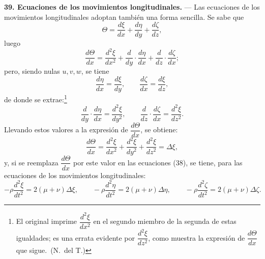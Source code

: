 \noindent\textbf{39. Ecuaciones de los movimientos longitudinales.} — Las
ecuaciones de los movimientos longitudinales adoptan también una forma
sencilla. Se sabe que
\[
\Theta=\frac{d\xi}{dx}+\frac{d\eta}{dy}+\frac{d\zeta}{dz},
\]
luego
\[
\frac{d\Theta}{dx}=\frac{d^2\xi}{dx^2}+\frac{d}{dy}\cdot\frac{d\eta}{dx}+\frac{d}{dz}\cdot\frac{d\zeta}{dx};
\]
pero, siendo nulas $u,v,w$, se tiene
\[
\frac{d\eta}{dx}=\frac{d\xi}{dy},\qquad \frac{d\zeta}{dx}=\frac{d\xi}{dz},
\]
de donde se extrae:\footnote{El original imprime
$\dfrac{d^2\xi}{dx^2}$ en el segundo miembro de la segunda de estas
igualdades; es una errata evidente por $\dfrac{d^2\xi}{dz^2}$, como muestra
la expresión de $\dfrac{d\Theta}{dx}$ que sigue.~(N.~del T.)}
\[
\frac{d}{dy}\cdot\frac{d\eta}{dx}=\frac{d^2\xi}{dy^2},\qquad
\frac{d}{dz}\cdot\frac{d\zeta}{dx}=\frac{d^2\xi}{dz^2}.
\]
Llevando estos valores a la expresión de $\dfrac{d\Theta}{dx}$, se obtiene:
\[
\frac{d\Theta}{dx}=\frac{d^2\xi}{dx^2}+\frac{d^2\xi}{dy^2}+\frac{d^2\xi}{dz^2}=\Delta\xi,
\]
y, si se reemplaza $\dfrac{d\Theta}{dx}$ por este valor en las ecuaciones
(38), se tiene, para las ecuaciones de los movimientos longitudinales:
\begin{equation}
-\rho\frac{d^2\xi}{dt^2}=2(\mu+\nu)\Delta\xi,\qquad
-\rho\frac{d^2\eta}{dt^2}=2(\mu+\nu)\Delta\eta,\qquad
-\rho\frac{d^2\zeta}{dt^2}=2(\mu+\nu)\Delta\zeta.
\tag{40}
\end{equation}
